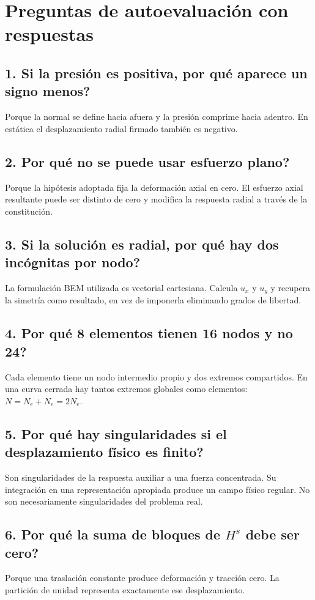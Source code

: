 \documentclass[11pt,a4paper]{report}
\numberwithin{equation}{chapter}
\begin{document}
\chapter{Preguntas de autoevaluaci\'on con respuestas}
\section*{1. Si la presi\'on es positiva, por qu\'e aparece un signo menos?}
Porque la normal se define hacia afuera y la presi\'on comprime hacia
adentro. En est\'atica el desplazamiento radial firmado tambi\'en es negativo.

\section*{2. Por qu\'e no se puede usar esfuerzo plano?}
Porque la hip\'otesis adoptada fija la deformaci\'on axial en cero.
El esfuerzo axial resultante puede ser distinto de cero y modifica
la respuesta radial a trav\'es de la constituci\'on.

\section*{3. Si la soluci\'on es radial, por qu\'e hay dos inc\'ognitas por nodo?}
La formulaci\'on BEM utilizada es vectorial cartesiana. Calcula
$u_x$ y $u_y$ y recupera la simetr\'ia como resultado, en vez de
imponerla eliminando grados de libertad.

\section*{4. Por qu\'e 8 elementos tienen 16 nodos y no 24?}
Cada elemento tiene un nodo intermedio propio y dos extremos compartidos.
En una curva cerrada hay tantos extremos globales como elementos:
$N=N_e+N_e=2N_e$.

\section*{5. Por qu\'e hay singularidades si el desplazamiento f\'isico es finito?}
Son singularidades de la respuesta auxiliar a una fuerza concentrada.
Su integraci\'on en una representaci\'on apropiada produce un campo
f\'isico regular. No son necesariamente singularidades del problema real.

\section*{6. Por qu\'e la suma de bloques de $H^s$ debe ser cero?}
Porque una traslaci\'on constante produce deformaci\'on y tracci\'on cero.
La partici\'on de unidad representa exactamente ese desplazamiento.
\end{document}
